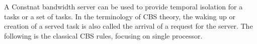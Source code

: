 %
%
A Constnat bandwidth server can be used to provide temporal isolation
for a tasks or a set of tasks. In the terminology of CBS theory, the 
waking up or creation of a served task is also called the arrival of a 
request for the server. The following is the classical CBS rules, 
focusing on single processor.

